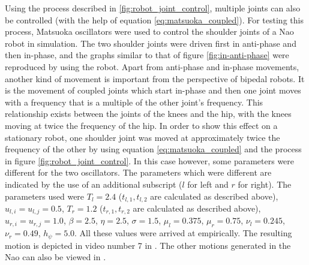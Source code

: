 \documentclass[12pt,twoside]{article}
\theoremstyle{plain}
\theoremstyle{definition}
\theoremstyle{remark}
\newcommand{\forceindent}{\leavevmode{\parindent=2em\indent}}
\begin{document}
\forceindent Using the process described in \ref{fig:robot_joint_control}, multiple joints can also be controlled (with the help of equation \ref{eq:matsuoka_coupled}). For testing this process, Matsuoka oscillators were used to control the shoulder joints of a Nao robot in simulation. The two shoulder joints were driven first in anti-phase and then in-phase, and the graphs similar to that of figure \ref{fig:in-anti-phase} were reproduced by using the robot. Apart from anti-phase and in-phase movements, another kind of movement is important from the perspective of bipedal robots. It is the movement of coupled joints which start in-phase and then one joint moves with a frequency that is a multiple of the other joint's frequency. This relationship exists between the joints of the knees and the hip, with the knees moving at twice the frequency of the hip. In order to show this effect on a stationary robot, one shoulder joint was moved at approximately twice the frequency of the other by using equation \ref{eq:matsuoka_coupled} and the process in figure \ref{fig:robot_joint_control}. In this case however, some parameters were  different for the two oscillators. The parameters which were different are indicated by the use of an additional subscript ($l$ for left and $r$ for right). The parameters used were $T_l=2.4$ ($t_{l,1},t_{l,2}$ are calculated as described above), $u_{l,i}=u_{l,j}=0.5$, $T_r=1.2$ ($t_{r,1},t_{r,2}$ are calculated as described above), $u_{r,i}=u_{r,j}=1.0$, $\beta=2.5$, $\eta=2.5$, $\sigma=1.5$, $\mu_l=0.375$, $\mu_r=0.75$, $\nu_l=0.245$, $\nu_r=0.49$, $h_\psi=5.0$. All these values were arrived at empirically. The resulting motion is depicted in video number 7 in \cite{Vid_Nao_Matsuoka}. The other motions generated in the Nao can also be viewed in \cite{Vid_Nao_Matsuoka}.
\end{document}
